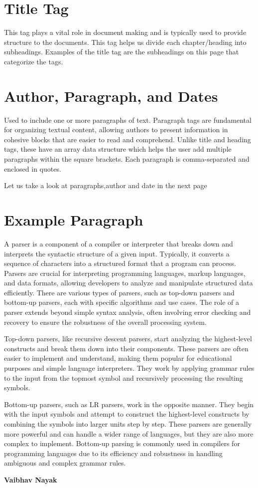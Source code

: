 \documentclass[oneside]{book}
\begin{document}
\section{Title Tag}
This tag plays a vital role in document making and is typically used to provide structure to the documents. This tag helps us divide each chapter/heading into subheadings.
        Examples of the title tag are the subheadings on this page that categorize the tags.\par
\section{Author, Paragraph, and Dates}
Used to include one or more paragraphs of text. Paragraph tags are fundamental for organizing textual content, allowing authors to present
        information in cohesive blocks that are easier to read and comprehend. Unlike title and heading tags, these have an array data structure which helps the user add multiple 
        paragraphs within the square brackets. Each paragraph is comma-separated and enclosed in quotes.\par
Let us take a look at paragraphs,author and date in the next page \par

\newpage
\section{Example Paragraph}
A parser is a component of a compiler or interpreter that breaks down and interprets the syntactic structure of a given input. Typically, it converts a sequence
        of characters into a structured format that a program can process. Parsers are crucial for interpreting programming languages, markup languages, and data formats,
        allowing developers to analyze and manipulate structured data efficiently. There are various types of parsers, such as top-down parsers and bottom-up parsers,
        each with specific algorithms and use cases. The role of a parser extends beyond simple syntax analysis, often involving error checking and recovery to ensure the 
        robustness of the overall processing system.\par
Top-down parsers, like recursive descent parsers, start analyzing the highest-level constructs and break them down into their components. These parsers are often
        easier to implement and understand, making them popular for educational purposes and simple language interpreters. They work by applying grammar rules to the input
        from the topmost symbol and recursively processing the resulting symbols.\par
Bottom-up parsers, such as LR parsers, work in the opposite manner. They begin with the input symbols and attempt to construct the highest-level constructs by
        combining the symbols into larger units step by step. These parsers are generally more powerful and can handle a wider range of languages, but they are also more
        complex to implement. Bottom-up parsing is commonly used in compilers for programming languages due to its efficiency and robustness in handling ambiguous and complex
        grammar rules.\par
\hfill \textbf{Vaibhav Nayak}
\date{2024-06-17}
\end{document}
